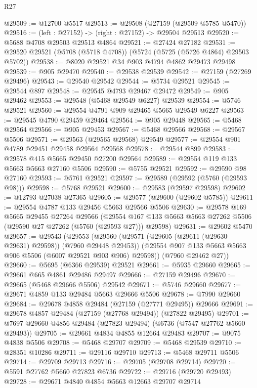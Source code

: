 \begin{lexlean}{R27}
\begin{coremodule}
@29509 := @12700 @5517
@29513 := @29508 (@27159 (@29509 @5785 @5470))
@29516 := (left : @27152) -> (right : @27152) -> @29504 @29513
@29520 := @5688 @4708 @29503 @29513 @4864
@29521 := @27424 @27182
@29531 := @29520 @29521 (@5708 (@5718 @4708)) (@5724 (@5725 (@5726 @4864) @29503 @5702))
@29538 := @8020 @29521 @34 @903 @4794 @4862 @29473 @29498
@29539 := @905 @29470
@29540 := @29538 @29539
@29542 := @27159 (@27269 @29496)
@29543 := @29540 @29542
@29544 := @5734 @29521
@29545 := @29544 @897
@29548 := @29545 @4793 @29467 @29472
@29549 := @905 @29462
@29553 := @29548 (@5468 @29549 @6227) @29539
@29554 := @5746 @29521
@29560 := @29554 @4791 @909 @29465 @5665 @29549 @6227
@29563 := @29545 @4790 @29459 @29464
@29564 := @905 @29448
@29565 := @5468 @29564
@29566 := @905 @29453
@29567 := @5468 @29566
@29568 := @29567 @5506
@29571 := @29563 (@29565 @29568) @29549
@29577 := @29554 @901 @4789 @29451 @29458 @29564 @29568
@29578 := @29544 @899
@29583 := @29578 @415 @5665 @29450 @27200 @29564
@29589 := @29554 @119 @133 @5663 @5663 @27160 @5506
@29590 := @5755 @29521
@29592 := @29590 @98 @27160
@29593 := @5761 @29521
@29597 := @29589 (@29592 (@5760 (@29593 @98)))
@29598 := @5768 @29521
@29600 := @29583 (@29597 @29598)
@29602 := @12793 @27038 @27365
@29605 := @29577 (@29600 (@29602 @5785))
@29611 := @29554 @4787 @133 @29456 @5663 @29566 @5506
@29630 := @29578
    @169
    @5665
    @29455
    @27264
    @29566
    (@29554 @167 @133 @5663 @5663 @27262 @5506 (@29590 @27 @27262 (@5760 (@29593 @27))) @29598)
@29631 := @29602 @5470
@29657 := @29543
    (@29553
      (@29560
        (@29571 (@29605 (@29611 (@29630 @29631) @29598)) (@7960 @29448 @29453))
        (@29554 @907 @133 @5663 @5663 @906 @5506 (@6007 @29521 @903 @906) @29598))
      (@7960 @29462 @27))
@29660 := @5695 (@6366 @29539) @29521
@29661 := @5935 @29660
@29665 := @29661 @665 @4861 @29486 @29497
@29666 := @27159 @29496
@29670 := @29665 (@5468 @29666 @5506) @29542
@29671 := @5746 @29660
@29677 := @29671 @4859 @133 @29484 @5663 @29666 @5506
@29678 := @7990 @29660
@29684 := @29678 @4858 @29484 (@27159 (@27771 @29495)) @29666
@29691 := @29678 @4857 @29484 (@27159 (@27768 @29494)) (@27822 @29495)
@29701 := @7697 @29660 @4856 @29484 (@27823 @29494) (@6736 (@7547 @27762 @5660 @29493))
@29705 := @29661 @4834 @4855 @12664 @29483
@29707 := @9075 @4838 @5506
@29708 := @5468 @29707
@29709 := @5468 @29539
@29710 := @28351 @10286
@29711 := @29116 @29710
@29713 := @5468 @29711 @5506
@29714 := @29709 @29713
@29716 := @29705 (@29708 @29714)
@29720 := @5591 @27762 @5660 @27823 @6736
@29722 := @29716 (@29720 @29493)
@29728 := @29671 @4840 @4854 @5663 @12663 @29707 @29714

\end{coremodule}
\end{lexlean}
